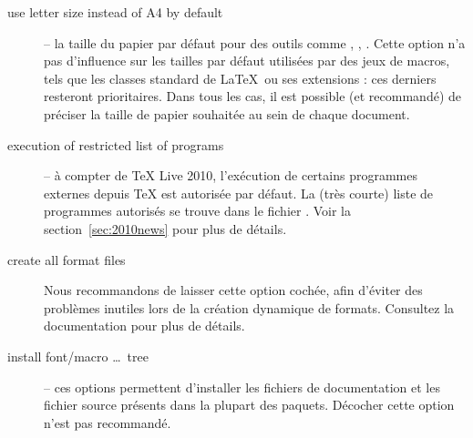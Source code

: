 \documentclass[german, english, french]{article}
\renewcommand{\TL}{\TeX{} Live\xspace}%
\begin{document}
\begin{description}
\item[use letter size instead of A4 by default] -- la taille du papier par
  défaut pour des outils comme , , .  Cette
  option n'a pas d'influence sur les tailles par défaut utilisées par des jeux
  de macros, tels que les classes standard de \LaTeX\ ou ses extensions : ces
  derniers resteront prioritaires. Dans tous les cas, il est possible (et
  recommandé) de préciser la taille de papier souhaitée au sein de chaque
  document.

\item[execution of restricted list of programs] -- à compter de \TL 2010,
  l'exécution de certains programmes externes depuis \TeX{} est autorisée par
  défaut. La (très courte) liste de programmes autorisés se trouve dans le
  fichier . Voir la section~\ref{sec:2010news} pour plus de
  détails.

\item [create all format files] Nous recommandons de laisser cette option
  cochée, afin d'éviter des problèmes inutiles lors de la création dynamique de
  formats.  Consultez la documentation  pour plus de détails.


\item[install font/macro \ldots\ tree] -- ces options permettent d'installer les
  fichiers de documentation et les fichier source présents dans la plupart des
  paquets. Décocher cette option n'est pas recommandé.


\end{description}
\end{document}
